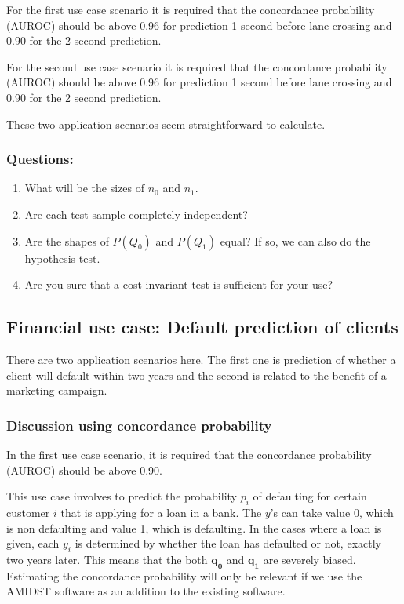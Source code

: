 \documentclass{article}
\theoremstyle{theorem}
\theoremstyle{definition}
\newcommand{\bv}[1]{\bm{#1}}
\begin{document}
For the first use case scenario it is required that the concordance probability (AUROC) should be above 0.96 for prediction 1 second before lane crossing and 0.90 for the 2 second prediction.

For the second use case scenario it is required that the concordance probability (AUROC) should be above 0.96 for prediction 1 second before lane crossing and 0.90 for the 2 second prediction.

These two application scenarios seem straightforward to calculate.

\subsubsection*{Questions: }
\begin{enumerate}
\item What will be the sizes of $n_0$ and $n_1$.
\item Are each test sample completely independent?
\item Are the shapes of $P(Q_0)$ and $P(Q_1)$ equal? If so, we can also do the hypothesis test.
\item Are you sure that a cost invariant test is sufficient for your use?
\end{enumerate}


\subsection{Financial use case: Default prediction of clients}
\label{sec:financial}

There are two application scenarios here.  The first one is prediction of whether a client will default within two years and the second is related to the benefit of a marketing campaign.

\subsubsection*{Discussion using concordance probability}

In the first use case scenario, it is required that the concordance probability (AUROC) should be above 0.90.

This use case involves to predict the probability $p_i$ of defaulting for certain customer $i$ that is applying for a loan in a bank.  The $y$'s can take value 0, which is non defaulting and value 1, which is defaulting.  
In the cases where a loan is given, each $y_i$ is determined by whether the loan has defaulted or not, exactly two years later.  This means that the both $\bv{q_0}$ and $\bv{q_1}$ are severely biased.  Estimating the concordance probability will only be relevant if we use the AMIDST software as an addition to the existing software.
\end{document}
